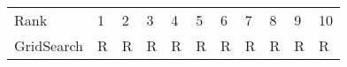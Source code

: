 \begin{tabular}{lllllllllll}
Rank & 1 & 2 & 3 & 4 & 5 & 6 & 7 & 8 & 9 & 10 \\
GridSearch & R & R & R & R & R & R & R & R & R & R \\
\end{tabular}
